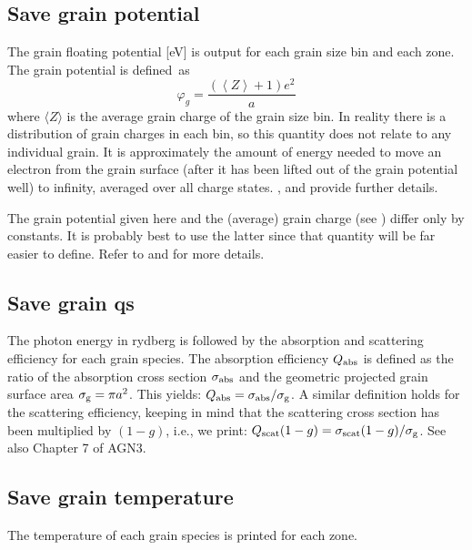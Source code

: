 \subsection{Save grain potential}

 The grain floating potential [eV] is output for each grain size bin and
each zone. The grain potential is defined~as
\begin{equation}
\varphi _g  = \frac{{\left( {\left\langle Z \right\rangle  + 1} \right)e^2
}}{a}
\end{equation}
where $\langle Z\rangle$ is the average grain charge of the grain size bin.  In reality
there is a distribution of grain charges in each bin, so this quantity does
not relate to any individual grain. It is approximately the amount of energy
needed to move an electron from the grain surface (after it has been lifted
out of the grain potential well) to infinity, averaged over all charge
states.
\citet{Weingartner2001a}, \citet{VanHoof2004} and \citet{Weingartner2006} provide further details.

The grain potential given here and the (average) grain charge
(see ) differ only by constants.  It
is probably best to use the latter since that quantity will be far easier
to define. Refer to \citet{Weingartner2001a} and
\citet{VanHoof2004}
for more details.

\subsection{Save grain qs}

The photon energy in rydberg is followed by the absorption and scattering
efficiency for each grain species. The absorption efficiency $Q_{\rm abs}$ is
defined as the ratio of the absorption cross section $\sigma_{\rm abs}$ and
the geometric projected grain surface area $\sigma_{\rm g} = \pi a^2$. This
yields: $Q_{\rm abs} = \sigma_{\rm abs}/\sigma_{\rm g}$. A similar definition
holds for the scattering efficiency, keeping in mind that the scattering cross
section has been multiplied by $(1-g)$, i.e., we print: $Q_{\rm scat} (1-g) =
\sigma_{\rm scat} (1-g) / \sigma_{\rm g}$. See also Chapter 7 of AGN3.

\subsection{Save grain temperature}

The temperature of each grain species is printed for each zone.

